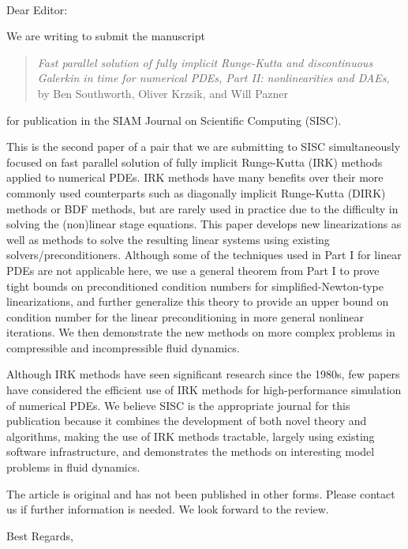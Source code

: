 \documentclass[12pt]{letter}
\date{}
\makeatletter
\renewcommand{\closing}[1]{\par\nobreak\vspace{\parskip}%
  \stopbreaks
  \noindent
  \ifx\@empty\fromaddress\else
  \hspace*{\longindentation}\fi
  \parbox{\indentedwidth}{\raggedright
       \ignorespaces #1\\[2\medskipamount]%
       \ifx\@empty\fromsig
           \fromname
       \else \fromsig \fi\strut}%
   \par}
\makeatother
\begin{document}
\begin{letter}
\\
\opening{Dear Editor:}
\vspace{3ex}

We are writing to submit the manuscript
\begin{quote}
\emph{Fast parallel solution of fully implicit Runge-Kutta and discontinuous
  Galerkin in time for numerical PDEs, Part II: nonlinearities and DAEs},\\
by Ben Southworth, Oliver Krzsik, and Will Pazner
\end{quote}
for publication in the SIAM Journal on Scientific Computing (SISC).

This is the second paper of a pair that we are submitting to SISC simultaneously
focused on fast parallel solution of fully implicit Runge-Kutta (IRK) methods applied
to numerical PDEs. IRK methods have many benefits over
their more commonly used counterparts such as diagonally implicit Runge-Kutta (DIRK)
methods or BDF methods, but are rarely used in practice due to the difficulty
in solving the (non)linear stage equations. This paper develops new linearizations
as well as methods to solve the resulting linear systems using existing
solvers/preconditioners. Although some of the techniques used in Part I for
linear PDEs are not applicable here, we use a general theorem from Part I to
prove tight bounds on preconditioned condition numbers for simplified-Newton-type
linearizations, and further generalize this theory to provide an upper bound on
condition number for the linear preconditioning in more general nonlinear iterations.
We then demonstrate the new methods on more complex problems in compressible and
incompressible fluid dynamics.

Although IRK methods have seen significant research since the 1980s, few
papers have considered the efficient use of IRK methods for high-performance
simulation of numerical PDEs. We believe SISC is the appropriate journal for
this publication because it combines the development of both novel theory and
algorithms, making the use of IRK methods tractable, largely using existing
software infrastructure, and demonstrates the methods on interesting model
problems in fluid dynamics.

The article is original and has not been published in other forms. Please
contact us if further information is needed. We look forward to the
review.\\

\closing{Best Regards,}


\end{letter}
\end{document}
